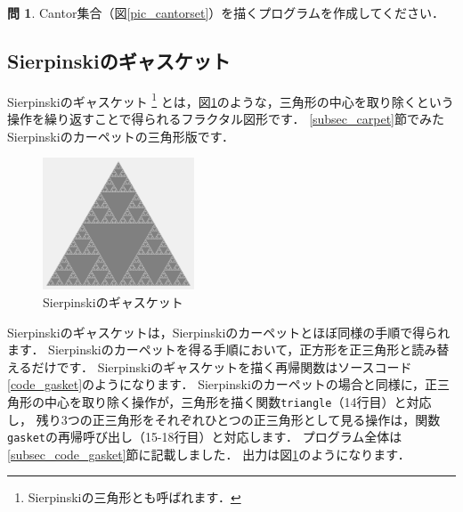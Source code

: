 \documentclass[dvipdfmx]{jsarticle}
\theoremstyle{definition}
\newtheorem{question}{問}[section]
\begin{document}
\begin{question}
    Cantor集合（図\ref{pic_cantorset}）を描くプログラムを作成してください．
\end{question}

\clearpage

\subsection{Sierpinskiのギャスケット}  \label{subsec_gasket}
Sierpinskiのギャスケット
\footnote{
    Sierpinskiの三角形とも呼ばれます．
}
とは，図\ref{pic_gasket}のような，三角形の中心を取り除くという操作を繰り返すことで得られるフラクタル図形です．
\ref{subsec_carpet}節でみたSierpinskiのカーペットの三角形版です．
%
\begin{figure}[H]
    \centering
    \includegraphics[width=0.4\textwidth]{figure/gasket/gasket.png}
    \caption{Sierpinskiのギャスケット}
    \label{pic_gasket}
\end{figure}

Sierpinskiのギャスケットは，Sierpinskiのカーペットとほぼ同様の手順で得られます．
Sierpinskiのカーペットを得る手順において，正方形を正三角形と読み替えるだけです．
Sierpinskiのギャスケットを描く再帰関数はソースコード\ref{code_gasket}のようになります．
Sierpinskiのカーペットの場合と同様に，正三角形の中心を取り除く操作が，三角形を描く関数\verb|triangle|（14行目）と対応し，
残り3つの正三角形をそれぞれひとつの正三角形として見る操作は，関数\verb|gasket|の再帰呼び出し（15-18行目）と対応します．
プログラム全体は\ref{subsec_code_gasket}節に記載しました．
出力は図\ref{pic_gasket}のようになります．
\end{document}
